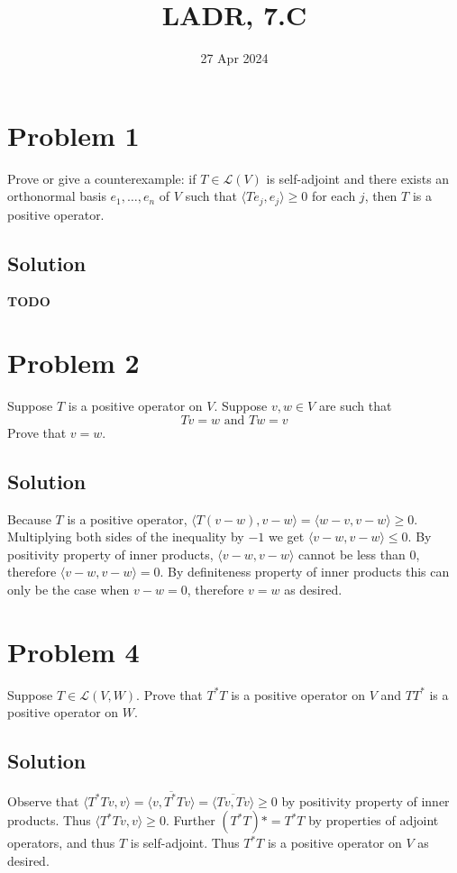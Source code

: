 \documentclass{article}
\title{LADR, 7.C}
\date{27 Apr 2024}
\begin{document}
\maketitle

\section*{Problem 1}
Prove or give a counterexample: if $T\in\mathcal{L}(V)$ is self-adjoint and there exists an orthonormal basis $e_1,\ldots,e_n$ of $V$ such that $\langle Te_j,e_j\rangle\geq 0$ for each $j$, then $T$ is a positive operator.

\subsection*{Solution}
\textbf{TODO}

\section*{Problem 2}
Suppose $T$ is a positive operator on $V$. Suppose $v,w\in V$ are such that
\[Tv=w\text{ and }Tw=v\]
Prove that $v=w$.

\subsection*{Solution}
Because $T$ is a positive operator, $\langle T(v-w), v-w\rangle=\langle w-v, v-w\rangle\geq 0$. Multiplying both sides of the inequality by $-1$ we get $\langle v-w, v-w\rangle\leq 0$. By positivity property of inner products, $\langle v-w, v-w\rangle$ cannot be less than $0$, therefore $\langle v-w, v-w\rangle=0$. By definiteness property of inner products this can only be the case when $v-w=0$, therefore $v=w$ as desired.

\section*{Problem 4}
Suppose $T\in\mathcal{L}(V,W)$. Prove that $T^*T$ is a positive operator on $V$ and $TT^*$ is a positive operator on $W$.

\subsection*{Solution}
Observe that $\langle T^*Tv,v\rangle=\overline{\langle v, T^*Tv\rangle}=\overline{\langle Tv, Tv\rangle}\geq0$ by positivity property of inner products. Thus $\langle T^*Tv,v\rangle\geq0$. Further $(T^*T)*=T^*T$ by properties of adjoint operators, and thus $T$ is self-adjoint. Thus $T^*T$ is a positive operator on $V$ as desired.
\end{document}
